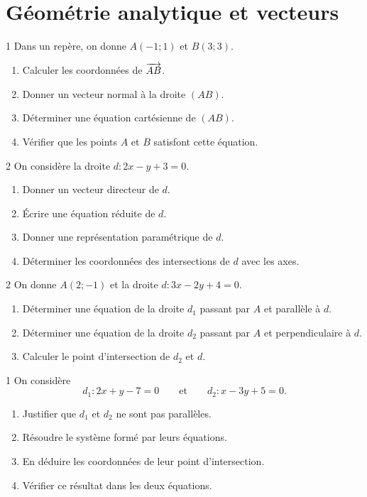 \section{Géométrie analytique et vecteurs}

\begin{exo}{1}
Dans un repère, on donne $A(-1;1)$ et $B(3;3)$.
\begin{enumerate}
  \item Calculer les coordonnées de $\overrightarrow{AB}$.
  \item Donner un vecteur normal à la droite $(AB)$.
  \item Déterminer une équation cartésienne de $(AB)$.
  \item Vérifier que les points $A$ et $B$ satisfont cette équation.
\end{enumerate}
\end{exo}

\begin{exo}{2}
On considère la droite $d:2x-y+3=0$.
\begin{enumerate}
  \item Donner un vecteur directeur de $d$.
  \item Écrire une équation réduite de $d$.
  \item Donner une représentation paramétrique de $d$.
  \item Déterminer les coordonnées des intersections de $d$ avec les axes.
\end{enumerate}
\end{exo}

\begin{exo}{2}
On donne $A(2;-1)$ et la droite $d:3x-2y+4=0$.
\begin{enumerate}
  \item Déterminer une équation de la droite $d_1$ passant par $A$ et
  parallèle à $d$.
  \item Déterminer une équation de la droite $d_2$ passant par $A$ et
  perpendiculaire à $d$.
  \item Calculer le point d'intersection de $d_2$ et $d$.
\end{enumerate}
\end{exo}

\begin{exo}{1}
On considère
\[
 d_1:2x+y-7=0
 \qquad\text{et}\qquad
 d_2:x-3y+5=0.
\]
\begin{enumerate}
  \item Justifier que $d_1$ et $d_2$ ne sont pas parallèles.
  \item Résoudre le système formé par leurs équations.
  \item En déduire les coordonnées de leur point d'intersection.
  \item Vérifier ce résultat dans les deux équations.
\end{enumerate}
\end{exo}


